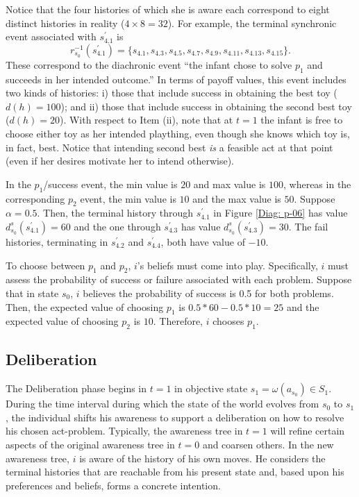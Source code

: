 \documentclass[
11pt,
titlepage,
reqno,
]{article}%
\theoremstyle{definition}
\begin{document}
Notice that the four histories of which she is aware each correspond to eight distinct histories in reality ($4\times 8=32$).
For example, the terminal synchronic event associated with $s_{4.1}^\prime$ is
\[ 
	r^{-1}_{s_0}(s_{4.1}^\prime)=\{s_{4.1},s_{4.3},s_{4.5},s_{4.7},s_{4.9},s_{4.11},s_{4.13},s_{4.15}\}.
\]
These correspond to the diachronic event ``the infant chose  to solve $p_1$ and succeeds in her intended outcome.''
In terms of payoff values, this event includes two kinds of histories: i) those that include success in obtaining the best toy ($d(h)=100$); and ii) those that include success in obtaining the second best toy ($d(h)=20$).
With respect to Item (ii), note that at $t=1$ the infant is free to choose either toy as her intended plaything, even though she knows which toy is, in fact, best.
Notice that intending second best \textit{is} a feasible act at that point (even if her desires motivate her to intend otherwise).

In the  $p_1$/success event, the min value is $20$ and max value is $100$, whereas in the corresponding $p_2$ event, the min value is $10$ and the max value is $50$.
Suppose $\alpha=0.5$. 
Then, the terminal history through $s^\prime_{4.1}$ in Figure \ref{Diag: p-06} has value $d^s_{s_0}(s^\prime_{4.1})=60$ and the one through  $s^\prime_{4.3}$  has value $d^s_{s_0}(s^\prime_{4.3})=30$.
The fail histories, terminating in $s^\prime_{4.2}$ and $s^\prime_{4.4}$,  both have value of $-10$.


To choose between $p_1$ and $p_2$, $i$'s beliefs must come into play.
Specifically, $i$ must assess the probability of success or failure associated with each problem. 
Suppose that in state $s_0$, $i$  believes the probability of success is 0.5 for both problems. 
Then, the expected value of choosing $p_1$ is $0.5*60-0.5*10=25$ and the expected value of choosing $p_2$ is $10$.
Therefore, $i$ chooses $p_1$.


\subsection{Deliberation}
The Deliberation phase begins in $t=1$ in objective state $s_1=\omega(a_{s_0})\in S_1$.
During the time interval during which the state of the world evolves from  $s_0$ to $s_1$, the individual shifts his awareness to support a deliberation on how to resolve his chosen act-problem. 
Typically, the awareness tree in $t=1$ will refine certain aspects of the original awareness tree in $t=0$ and coarsen others.
In the new awareness tree, $i$ is aware of the history of his own moves.
He considers the terminal histories that are reachable from his present state and, based upon his preferences and beliefs, forms a concrete intention.
\end{document}
